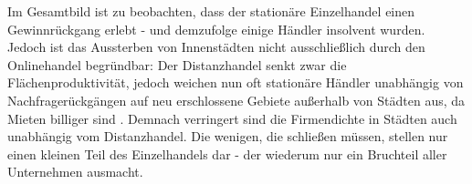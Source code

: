 Im Gesamtbild ist zu beobachten, dass der stationäre Einzelhandel einen Gewinnrückgang erlebt - und demzufolge einige Händler insolvent wurden. Jedoch ist das Aussterben von Innenstädten nicht ausschließlich durch den Onlinehandel begründbar: Der Distanzhandel senkt zwar die Flächenproduktivität, jedoch weichen nun oft stationäre Händler unabhängig von Nachfragerückgängen auf neu erschlossene Gebiete außerhalb von Städten aus, da Mieten billiger sind \cite[S. 30]{evilcom}. Demnach verringert sind die Firmendichte in Städten auch unabhängig vom Distanzhandel. Die wenigen, die schließen müssen, stellen nur einen kleinen Teil des Einzelhandels dar - der wiederum nur ein Bruchteil aller Unternehmen ausmacht.


